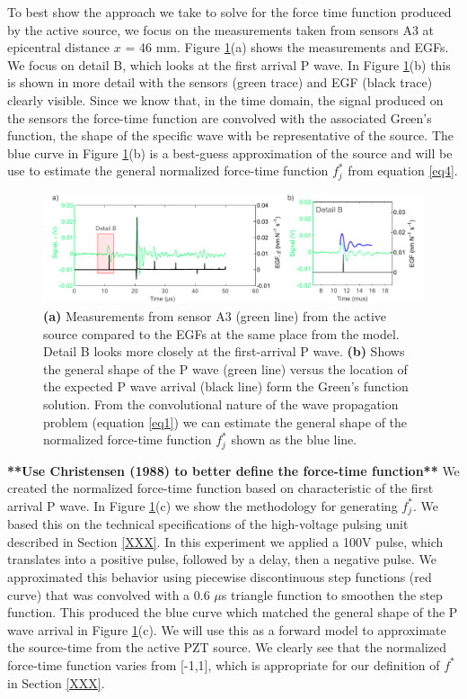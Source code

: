 \documentclass[preprint,3p, 11pt,authoryear]{elsarticle}
\begin{document}
To best show the approach we take to solve for the force time function produced by the active source, we focus on the measurements taken from sensors A3 at epicentral distance $x$ = 46 mm. Figure \ref{fig5}(a) shows the measurements and EGFs.  We focus on detail B, which looks at the first arrival P wave.  In Figure \ref{fig5}(b) this is shown in more detail with the sensors (green trace) and EGF (black trace) clearly visible.  Since we know that, in the time domain, the signal produced on the sensors the force-time function are convolved with the associated Green's function, the shape of the specific wave with be representative of the source. The blue curve in Figure \ref{fig5}(b) is a best-guess approximation of the source and will be use to estimate the general normalized force-time function $f^{*}_{j}$ from equation \eqref{eq4}.

\begin{figure}[ht]
     	\centering
\includegraphics[scale= 0.85]{FIG5.pdf} 
\caption{\textbf{(a)} Measurements from sensor A3 (green line) from the active source compared to the EGFs at the same place from the model.  Detail B looks more closely at the first-arrival P wave. \textbf{(b)} Shows the general shape of the P wave (green line) versus the location of the expected P wave arrival (black line) form the Green's function solution.  From the convolutional nature of the wave propagation problem (equation \eqref{eq1}) we can estimate the general shape of the normalized force-time function $f^{*}_{j}$ shown as the blue line.}
	\label{fig5} 
\end{figure}

\textbf{**Use Christensen (1988) to better define the force-time function**} We created the normalized force-time function based on characteristic of the first arrival P wave.  In Figure \ref{fig5}(c) we show the methodology for generating $f^{*}_{j}$.  We based this on the technical specifications of the high-voltage pulsing unit described in Section \ref{XXX}. In this experiment we applied a 100V pulse, which translates into a positive pulse, followed by a delay, then a negative pulse.  We approximated this behavior using piecewise discontinuous step functions (red curve) that was convolved with a 0.6 $\mu$s triangle function to smoothen the step function. This produced the blue curve which matched the general shape of the P wave arrival in Figure \ref{fig5}(c).  We will use this as a forward model to approximate the source-time from the active PZT source. We clearly see that the normalized force-time function varies from [-1,1], which is appropriate for our definition of $f^{*}$ in Section \ref{XXX}.
\end{document}
